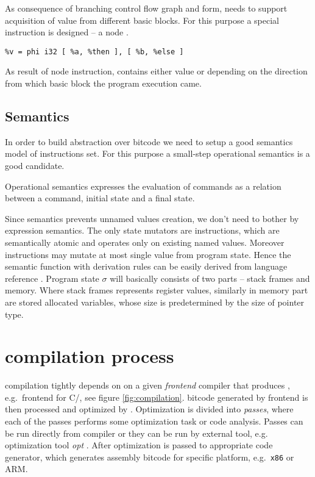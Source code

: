 As consequence of branching control flow graph and \SSA form, \LLVM needs to
support acquisition of value from different basic blocks. For this
purpose a special instruction is designed -- a  node \cite{Cytron91}.

\begin{verbatim}
%v = phi i32 [ %a, %then ], [ %b, %else ]
\end{verbatim}

As result of  node instruction,  contains either value  or 
depending on the direction from which basic block the program execution came.

\subsection{Semantics} \label{subsec:semantics}

In order to build abstraction over \LLVM bitcode we need to setup a good
semantics model of instructions set. For this purpose a small-step operational
semantics \cite{Plotkin04} is a good candidate.

\begin{definition}
Operational semantics expresses the evaluation of commands as a relation between
a command, initial state and a final state.
\end{definition}

\noindent
Since \LLVMIR semantics prevents unnamed values creation, we don't need to
bother by expression semantics. The only state mutators are instructions, which are
semantically atomic and operates only on existing named values. Moreover
instructions may mutate at most single value from program state. Hence the
semantic function with derivation rules can be easily derived from \LLVM
language reference \cite{LLVM:langref}. Program state $\sigma$ will basically
consists of two parts -- stack frames and memory. Where stack frames represents
register values, similarly in memory part are stored allocated variables, whose
size is predetermined by the size of pointer type.

\section{\LLVM compilation process} \label{sec:compilation}

\LLVM compilation tightly depends on on a given \emph{frontend} compiler that produces
\LLVMIR, e.g.~\clang frontend for C/\Cpp{}, see figure \autoref{fig:compilation}.
\LLVM bitcode generated by frontend is then processed and optimized by \LLVM.
Optimization is divided into \LLVM \emph{passes}, where each of the passes
performs some optimization task or code analysis. Passes can be run directly
from compiler or they can be run by external tool, e.g.~\LLVM
optimization tool \emph{opt} \cite{LLVM:opt}. After optimization \LLVMIR is passed to
appropriate code generator, which generates assembly bitcode for specific
platform, e.g.~\texttt{x86} or ARM.

